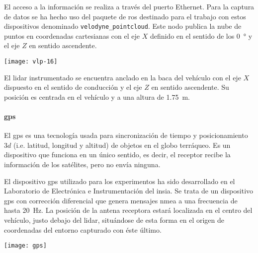 El acceso a la información se realiza a través del puerto Ethernet. Para la captura de datos se ha hecho uso del paquete de \ac{ros} destinado para el trabajo con estos dispositivos denominado \texttt{velodyne\_pointcloud}. Este nodo publica la nube de puntos en coordenadas cartesianas con el eje $X$ definido en el sentido de los \SI{0}{\degree} y el eje $Z$ en sentido ascendente.

\begin{marginfigure}
	\texttt{[image: vlp-16]}
	\caption[\acrshort{lidar} modelo VLP-$16$ de empresa Velodyne]{El \acrshort{lidar} VLP-16 de Velodyne tiene un FOV horizontal de \SI{360}{\degree} y vertical de \SI{\pm15}{\degree}, permitiendo una captura de todo el entorno circundante a una frecuencia de hasta \SI{20}{\Hz}. Fuente: \url{http://velodynelidar.com/vlp-16.html}.}
	\label{fig:vlp-16}
\end{marginfigure}

El \acrshort{lidar} instrumentado se encuentra anclado en la baca del vehículo con el eje $X$ dispuesto en el sentido de conducción y el eje $Z$ en sentido ascendente. Su posición es centrada en el vehículo y a una altura de \SI{1.75}{\meter}.

\paragraph{\Acrshort{gps}}

El \Acrshort{gps} es una tecnología usada para sincronización de tiempo y posicionamiento $3d$ (i.e. latitud, longitud y altitud) de objetos en el globo terráqueo. Es un dispositivo que funciona en un único sentido, es decir, el receptor recibe la información de los satélites, pero no envía ninguna.

El dispositivo \Acrshort{gps} utilizado para los experimentos ha sido desarrollado en el Laboratorio de Electrónica e Instrumentación del \ac{insia}. Se trata de un dispositivo \Acrshort{gps} con corrección diferencial que genera mensajes \ac{nmea} a una frecuencia de hasta \SI{20}{\Hz}. La posición de la antena receptora estará localizada en el centro del vehículo, justo debajo del \acrshort{lidar}, situándose de esta forma en el origen de coordenadas del entorno capturado con éste último.

\begin{marginfigure}
	\centering
	\texttt{[image: gps]}
	\caption[Posicionamiento \Acrshort{gps} sobre la tierra]{El \Acrshort{gps} permite el posicionamiento 3d sobre en la tierra gracias a la comunicación unidireccional de satélites situados en órbita. Fuente: Wikimedia Commons.}
	\label{fig:gps}
\end{marginfigure}

